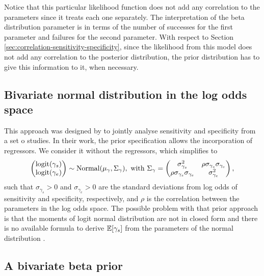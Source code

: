 Notice that this particular likelihood function does not add any correlation to the
parameters since it treats each one separately. The interpretation of the beta
distribution parameter is in terms of the number of successes for the first
parameter and failures for the second parameter. With respect to Section
\ref{sec:correlation-sensitivity-specificity}, since the likelihood from this
model does not add any correlation to the posterior distribution, the prior
distribution has to give this information to it, when necessary.  

\subsection{Bivariate normal distribution in the log odds space}

This approach was designed by \textcite{chu2006bivariate} to jointly analyse 
sensitivity and specificity from a set o studies. In their work, the prior
specification allows the incorporation of regressors. We consider it without
the regressors, which simplifies to
\begin{equation*}
  \begin{pmatrix}
    \operatorname{logit}(\gamma_s) \\
    \operatorname{logit}(\gamma_e)
  \end{pmatrix}
\sim \operatorname{Normal}(\mu_{\gamma}, \Sigma_{\gamma}), \text{ with } \Sigma_{\gamma} =  
\begin{pmatrix}
  \sigma_{\gamma_s}^2 & \rho\sigma_{\gamma_s}\sigma_{\gamma_e} \\
  \rho\sigma_{\gamma_s}\sigma_{\gamma_e} & \sigma_{\gamma_e}^2  
\end{pmatrix},
\end{equation*}
such that $\sigma_{\gamma_s} > 0$ and $\sigma_{\gamma_e} > 0$ are the
standard deviations from log odds of sensitivity and specificity,
respectively, and $\rho$ is the correlation between the parameters in the log 
odds space. The possible problem with that prior approach is that the moments
of logit normal distribution are not in closed form and there is no available
formula to derive $\mathbb{E}[\gamma_s]$ from the parameters of the normal
distribution \cite{kurt2021logit}. 

\subsection{A bivariate beta prior}

